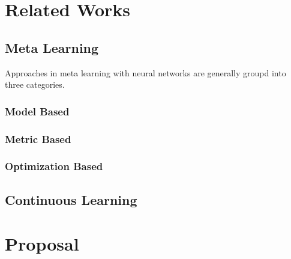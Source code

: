 \documentclass{report}
\begin{document}
	\chapter{Related Works}
	\section{Meta Learning}
	Approaches in meta learning with neural networks are generally groupd into three categories.
	\subsection{Model Based}
	\subsection{Metric Based}
	\subsection{Optimization Based}
	\section{Continuous Learning}
	
	\chapter{Proposal}
	
\end{document}

